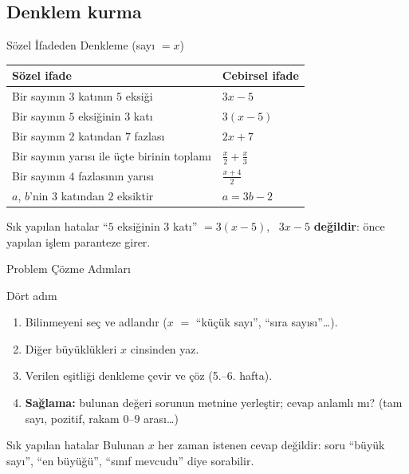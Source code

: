 \documentclass[aspectratio=169,11pt,handout]{beamer}
\begin{document}
\subsection{Denklem kurma}
\begin{frame}{Sözel İfadeden Denkleme (sayı \(=x\))}
\begin{center}
\renewcommand{\arraystretch}{1.35}
\begin{tabular}{ll}
\toprule
Sözel ifade & Cebirsel ifade\\\midrule
Bir sayının \(3\) katının \(5\) eksiği & \(3x-5\)\\
Bir sayının \(5\) eksiğinin \(3\) katı & \(3(x-5)\)\\
Bir sayının \(2\) katından \(7\) fazlası & \(2x+7\)\\
Bir sayının yarısı ile üçte birinin toplamı & \(\tfrac{x}{2}+\tfrac{x}{3}\)\\
Bir sayının \(4\) fazlasının yarısı & \(\tfrac{x+4}{2}\)\\
\(a\), \(b\)'nin \(3\) katından \(2\) eksiktir & \(a=3b-2\)\\\bottomrule
\end{tabular}
\end{center}
\begin{alertblock}{Sık yapılan hatalar}
``\(5\) eksiğinin \(3\) katı'' \(=3(x-5)\), \ \(3x-5\) \textbf{değildir}: önce yapılan işlem paranteze girer.
\end{alertblock}
\end{frame}

\begin{frame}{Problem Çözme Adımları}
\begin{block}{Dört adım}
\begin{enumerate}
\item Bilinmeyeni seç ve adlandır (\(x\) \(=\) ``küçük sayı'', ``sıra sayısı''\dots).
\item Diğer büyüklükleri \(x\) cinsinden yaz.
\item Verilen eşitliği denkleme çevir ve çöz (5.--6. hafta).
\item \textbf{Sağlama:} bulunan değeri sorunun metnine yerleştir; cevap anlamlı mı? (tam sayı, pozitif, rakam \(0\)--\(9\) arası\dots)
\end{enumerate}
\end{block}
\begin{alertblock}{Sık yapılan hatalar}
Bulunan \(x\) her zaman istenen cevap değildir: soru ``büyük sayı'', ``en büyüğü'', ``sınıf mevcudu'' diye sorabilir.
\end{alertblock}
\end{frame}
\end{document}
